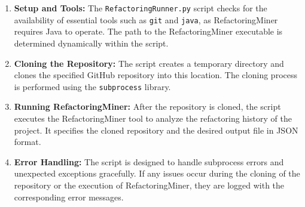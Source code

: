 \documentclass[sigconf]{acmart}
\begin{document}
\begin{enumerate}
    \item \textbf{Setup and Tools:} The \texttt{RefactoringRunner.py} script checks for the availability of essential tools such as \texttt{git} and \texttt{java}, as RefactoringMiner requires Java to operate. The path to the RefactoringMiner executable is determined dynamically within the script.

    \item \textbf{Cloning the Repository:} The script creates a temporary directory and clones the specified GitHub repository into this location. The cloning process is performed using the \texttt{subprocess} library.

    \item \textbf{Running RefactoringMiner:} After the repository is cloned, the script executes the RefactoringMiner tool to analyze the refactoring history of the project. It specifies the cloned repository and the desired output file in JSON format.

    \item \textbf{Error Handling:} The script is designed to handle subprocess errors and unexpected exceptions gracefully. If any issues occur during the cloning of the repository or the execution of RefactoringMiner, they are logged with the corresponding error messages.


\end{enumerate}
\end{document}
